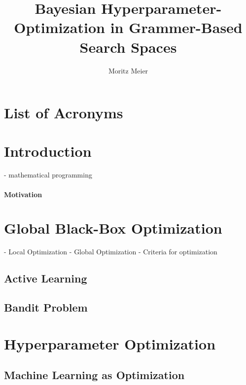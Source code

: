 \documentclass[english]{article}
\begin{document}
\title{Bayesian Hyperparameter-Optimization in Grammer-Based Search Spaces}
\author{Moritz Meier}
\maketitle
\tableofcontents
\newpage

\section*{List of Acronyms}
\begin{acronym}
\end{acronym}

\section{Introduction}
 - mathematical programming

\paragraph{Motivation}

\section{Global Black-Box Optimization}
 - Local Optimization
 - Global Optimization
 - Criteria for optimization

\subsection{Active Learning}


\subsection{Bandit Problem}



\section{Hyperparameter Optimization}

\subsection{Machine Learning as Optimization}
\end{document}
